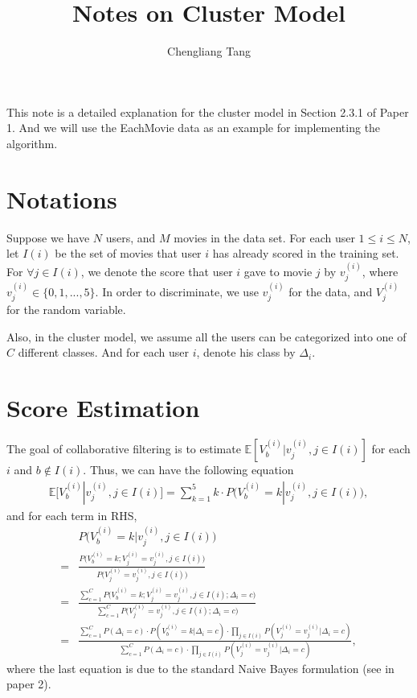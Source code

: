 \documentclass[a4paper,10pt]{article}
\author{Chengliang Tang}
\title{Notes on Cluster Model}
\begin{document}
\maketitle
This note is a detailed explanation for the cluster model in Section 2.3.1 of Paper 1. And we will use the EachMovie data as an example for implementing the algorithm.

\section{Notations}
Suppose we have $N$ users, and $M$ movies in the data set. For each user $1 \leq i \leq N$, let $I(i)$ be the set of movies that user $i$ has already scored in the training set. For $\forall j \in I(i)$, we denote the score that user $i$ gave to movie $j$ by $v_{j}^{(i)}$, where $v_{j}^{(i)} \in \{0, 1, ..., 5\}$. In order to discriminate, we use $v_{j}^{(i)}$ for the data, and $V_{j}^{(i)}$ for the random variable.

Also, in the cluster model, we assume all the users can be categorized into one of $C$ different classes. And for each user $i$, denote his class by $\Delta_i$.

\section{Score Estimation}
The goal of collaborative filtering is to estimate $\mathbb{E}[V_b^{(i)}| v_j^{(i)}, j \in I(i)]$ for each $i$ and $b \notin I(i)$. Thus, we can have the following equation
\begin{equation}
\begin{split}
\mathbb{E}[V_b^{(i)}| v_j^{(i)}, j \in I(i)] = \sum_{k = 1}^{5}k \cdot P\big(V_b^{(i)} = k | v_j^{(i)}, j \in I(i)\big),
\end{split}
\end{equation}
and for each term in RHS,
\begin{equation}
\begin{split}
   &P\big(V_b^{(i)} = k | v_j^{(i)}, j \in I(i)\big) \\
= &\frac{P\big(V_b^{(i)} = k; V_j^{(i)} = v_j^{(i)}, j \in I(i)\big)}{P \big(V_j^{(i)} = v_j^{(i)}, j \in I(i)\big)} \\
= & \frac{\sum_{c = 1}^{C}P\big(V_b^{(i)} = k; V_j^{(i)} = v_j^{(i)}, j \in I(i); \Delta_i = c\big)}{\sum_{c = 1}^{C}P \big(V_j^{(i)} = v_j^{(i)}, j \in I(i); \Delta_i = c \big)} \\
= & \frac{\sum_{c = 1}^{C} P(\Delta_i = c) \cdot P(V_b^{(i)} = k | \Delta_i = c) \cdot \prod_{j \in I(i)}P(V_j^{(i)} = v_j^{(i)} | \Delta_i = c ) }{\sum_{c = 1}^{C} P(\Delta_i = c)  \cdot \prod_{j \in I(i)}P(V_j^{(i)} = v_j^{(i)} | \Delta_i = c ) },
\end{split} 
\end{equation}
where the last equation is due to the standard Naive Bayes formulation (see in paper 2).
\end{document}
